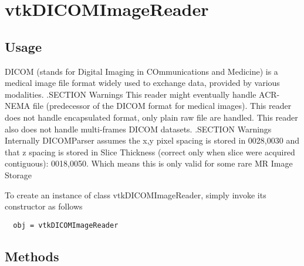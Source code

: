 \section{vtkDICOMImageReader}

\subsection{Usage}

 DICOM (stands for Digital Imaging in COmmunications and Medicine)
 is a medical image file format widely used to exchange data, provided
 by various modalities.
 .SECTION Warnings
 This reader might eventually handle ACR-NEMA file (predecessor of the DICOM
 format for medical images).
 This reader does not handle encapsulated format, only plain raw file are
 handled. This reader also does not handle multi-frames DICOM datasets.
 .SECTION Warnings
 Internally DICOMParser assumes the x,y pixel spacing is stored in 0028,0030 and
 that z spacing is stored in Slice Thickness (correct only when slice were acquired
 contiguous): 0018,0050. Which means this is only valid for some rare 
 MR Image Storage
 

To create an instance of class vtkDICOMImageReader, simply
invoke its constructor as follows
\begin{verbatim}
  obj = vtkDICOMImageReader
\end{verbatim}
\subsection{Methods}

